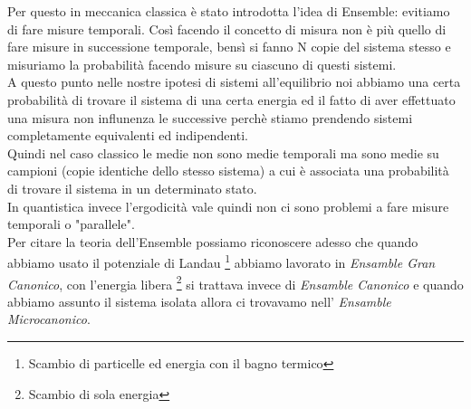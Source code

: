 Per questo in meccanica classica è stato introdotta l'idea di Ensemble: evitiamo di fare misure temporali. Così facendo il concetto di misura non è più quello di fare misure in successione temporale, bensì si fanno N copie del sistema stesso e misuriamo la probabilità facendo misure su ciascuno di questi sistemi.\\
A questo punto nelle nostre ipotesi di sistemi all'equilibrio noi abbiamo una certa probabilità di trovare il sistema di una certa energia ed il fatto di aver effettuato una misura non influnenza le successive perchè stiamo prendendo sistemi completamente equivalenti ed indipendenti.\\
Quindi nel caso classico le medie non sono medie temporali ma sono medie su campioni (copie identiche dello stesso sistema) a cui è associata una probabilità di trovare il sistema in un determinato stato.\\
In quantistica invece l'ergodicità vale quindi non ci sono problemi a fare misure temporali o "parallele".\\
Per citare la teoria dell'Ensemble possiamo riconoscere adesso che quando abbiamo usato il potenziale di Landau \footnote{Scambio di particelle ed energia con il bagno termico} abbiamo lavorato in \textit{Ensamble Gran Canonico}, con l'energia libera \footnote{Scambio di sola energia} si trattava invece di \textit{Ensamble Canonico} e quando abbiamo assunto il sistema isolata allora ci trovavamo nell' \textit{Ensamble Microcanonico}.

